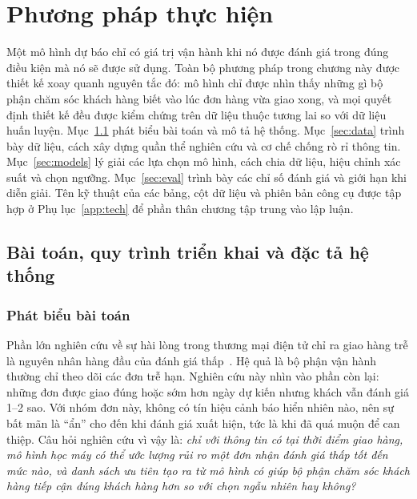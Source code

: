\chapter{Phương pháp thực hiện}\label{ch:method}

Một mô hình dự báo chỉ có giá trị vận hành khi nó được đánh giá trong đúng điều kiện mà nó sẽ được sử dụng. Toàn bộ phương pháp trong chương này được thiết kế xoay quanh nguyên tắc đó: mô hình chỉ được nhìn thấy những gì bộ phận chăm sóc khách hàng biết vào lúc đơn hàng vừa giao xong, và mọi quyết định thiết kế đều được kiểm chứng trên dữ liệu thuộc tương lai so với dữ liệu huấn luyện. Mục~\ref{sec:pipeline} phát biểu bài toán và mô tả hệ thống. Mục~\ref{sec:data} trình bày dữ liệu, cách xây dựng quần thể nghiên cứu và cơ chế chống rò rỉ thông tin. Mục~\ref{sec:models} lý giải các lựa chọn mô hình, cách chia dữ liệu, hiệu chỉnh xác suất và chọn ngưỡng. Mục~\ref{sec:eval} trình bày các chỉ số đánh giá và giới hạn khi diễn giải. Tên kỹ thuật của các bảng, cột dữ liệu và phiên bản công cụ được tập hợp ở Phụ lục~\ref{app:tech} để phần thân chương tập trung vào lập luận.

\section{Bài toán, quy trình triển khai và đặc tả hệ thống}\label{sec:pipeline}

\subsection{Phát biểu bài toán}

Phần lớn nghiên cứu về sự hài lòng trong thương mại điện tử chỉ ra giao hàng trễ là nguyên nhân hàng đầu của đánh giá thấp~\cite{ravula2023,deshpande2023}. Hệ quả là bộ phận vận hành thường chỉ theo dõi các đơn trễ hạn. Nghiên cứu này nhìn vào phần còn lại: những đơn được giao đúng hoặc sớm hơn ngày dự kiến nhưng khách vẫn đánh giá 1--2 sao. Với nhóm đơn này, không có tín hiệu cảnh báo hiển nhiên nào, nên sự bất mãn là ``ẩn'' cho đến khi đánh giá xuất hiện, tức là khi đã quá muộn để can thiệp. Câu hỏi nghiên cứu vì vậy là: \emph{chỉ với thông tin có tại thời điểm giao hàng, mô hình học máy có thể ước lượng rủi ro một đơn nhận đánh giá thấp tốt đến mức nào, và danh sách ưu tiên tạo ra từ mô hình có giúp bộ phận chăm sóc khách hàng tiếp cận đúng khách hàng hơn so với chọn ngẫu nhiên hay không?}

